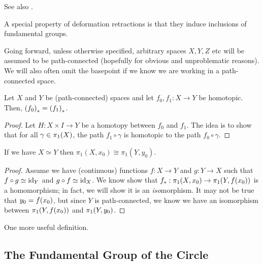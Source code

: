 See also \cite[Ch 4, \S 4, Définition 4.3]{EPFLTopologie}.

A special property of deformation retractions is that they induce inclusions of fundamental groups.

\begin{boxconvention}
    Going forward, unless otherwise specified, arbitrary spaces $X, Y, Z$ etc will be assumed to be path-connected (hopefully for obvious and unproblematic reasons). We will also often omit the basepoint if we know we are working in a path-connected space.
\end{boxconvention}

\begin{boxlemma}
    Let $X$ and $Y$ be (path-connected) spaces and let $f_0, f_1 : X \to Y$ be homotopic. Then, $\left( f_0 \right)_* = \left( f_1 \right)_*$.
\end{boxlemma}
\begin{proof}
    Let $H : X \times I \to Y$ be a homotopy between $f_0$ and $f_1$. The idea is to show that for all $\gamma \in \pi_1\!\left( X \right)$, the path $f_1 \circ \gamma$ is homotopic to the path $f_0 \circ \gamma$. \sorry
\end{proof}

\begin{boxtheorem}
    If we have $X\simeq Y$ then $\pi_1(X, x_0)\cong \pi_1(Y, y_0)$.
\end{boxtheorem}
\begin{proof}
    Assume we have (continuous) functions $f : X \to Y$ and $g : Y \to X$ such that $f \circ g \simeq \operatorname{id}_Y$ and $g \circ f \simeq \operatorname{id}_X$. We know show that $f_* : \pi_1\!\left( X, x_0 \right) \to \pi_1\!\left( Y, f\!\left( x_0 \right) \right)$ is a homomorphism; in fact, we will show it is an \textit{iso}morphism. It may not be true that $y_0 = f\!\left( x_0 \right)$, but since $Y$ is path-connected, we know we have an isomorphism between $\pi_1\!\left( Y, f\!\left( x_0 \right) \right)$ and $\pi_1\!\left( Y, y_0 \right)$.

    \sorry %
\end{proof}

One more useful definition.

\subsection{The Fundamental Group of the Circle}

